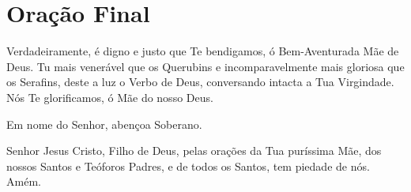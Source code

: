 \documentclass{subfiles}
\begin{document}
\section*{Oração Final}

Verdadeiramente, é digno e justo que Te bendigamos, ó Bem-Aventurada Mãe de
Deus. Tu mais venerável que os Querubins e incomparavelmente mais gloriosa que
os Serafins, deste a luz o Verbo de Deus, conversando intacta a Tua Virgindade.
Nós Te glorificamos, ó Mãe do nosso Deus.

\Doxology{}

\mercy{} \thrice{}

Em nome do Senhor, abençoa Soberano.

Senhor Jesus Cristo, Filho de Deus, pelas orações da Tua puríssima Mãe, dos
nossos Santos e Teóforos Padres, e de todos os Santos, tem piedade de nós. Amém.
\end{document}
